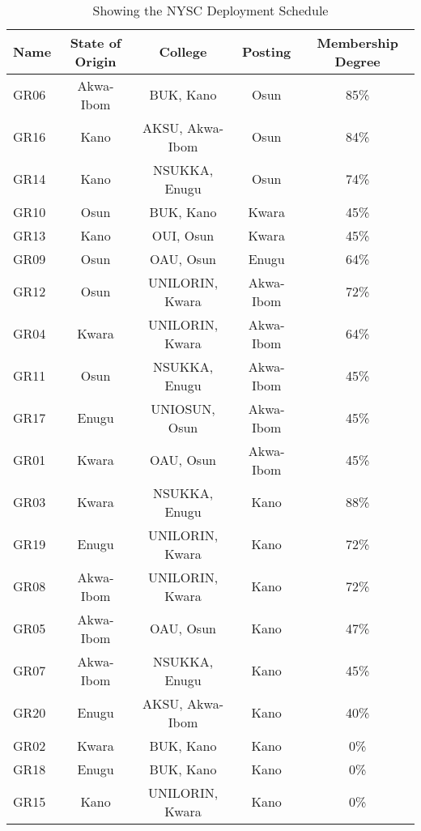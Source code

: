 \documentclass[a4paper,openany]{book}
\begin{document}
					\paragraph{}
						\begin{table}[!th]
							\begin{center}
								\begin{tabular}{|l|c|c|c|c|}
									\hline
									\textbf{Name} & \textbf{State of Origin} & \textbf{College} & \textbf{Posting} & \textbf{Membership Degree} \\
									\hline
									GR06 & Akwa-Ibom & BUK, Kano & Osun & 85\% \\
									\hline
									GR16 & Kano & AKSU, Akwa-Ibom & Osun & 84\% \\
									\hline
									GR14 & Kano & NSUKKA, Enugu & Osun & 74\% \\
									\hline
									GR10 & Osun & BUK, Kano & Kwara & 45\% \\
									\hline
									GR13 & Kano & OUI, Osun & Kwara & 45\% \\
									\hline
									GR09 & Osun & OAU, Osun & Enugu & 64\% \\
									\hline
									GR12 & Osun & UNILORIN, Kwara & Akwa-Ibom & 72\% \\
									\hline
									GR04 & Kwara & UNILORIN, Kwara & Akwa-Ibom & 64\% \\
									\hline
									GR11 & Osun & NSUKKA, Enugu & Akwa-Ibom & 45\% \\
									\hline
									GR17 & Enugu & UNIOSUN, Osun & Akwa-Ibom & 45\% \\
									\hline
									GR01 & Kwara & OAU, Osun & Akwa-Ibom & 45\% \\
									\hline
									GR03 & Kwara & NSUKKA, Enugu & Kano & 88\% \\
									\hline
									GR19 & Enugu & UNILORIN, Kwara & Kano & 72\% \\
									\hline
									GR08 & Akwa-Ibom & UNILORIN, Kwara & Kano & 72\% \\
									\hline
									GR05 & Akwa-Ibom & OAU, Osun & Kano & 47\% \\
									\hline
									GR07 & Akwa-Ibom & NSUKKA, Enugu & Kano & 45\% \\
									\hline
									GR20 & Enugu & AKSU, Akwa-Ibom & Kano & 40\% \\
									\hline
									GR02 & Kwara & BUK, Kano & Kano & 0\% \\
									\hline
									GR18 & Enugu & BUK, Kano & Kano & 0\% \\
									\hline
									GR15 & Kano & UNILORIN, Kwara & Kano & 0\% \\
									\hline
								\end{tabular}
								\caption{Showing the NYSC Deployment Schedule}
								\label{ex:table}
							\end{center}							
						\end{table}
\end{document}

